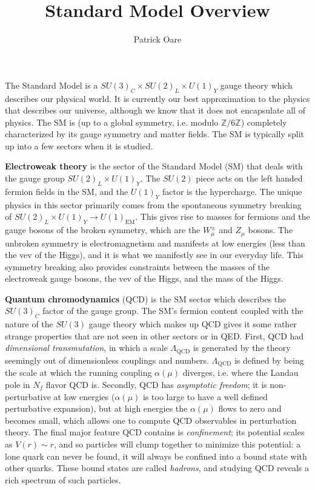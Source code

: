 \documentclass[11pt, oneside]{article}   	%
\title{Standard Model Overview}
\author{Patrick Oare}
\date{}							%
\theoremstyle{definition}
\begin{document}
\maketitle

The Standard Model is a $SU(3)_C\times SU(2)_L\times U(1)_Y$ gauge theory which describes our physical world. It is currently 
our best approximation to the physics that describes our universe, although we know that it does not encapsulate all of physics. 
The SM is (up to a global symmetry, i.e. modulo $\mathbb Z / 6\mathbb Z$) completely characterized by its gauge symmetry 
and matter fields. The SM is typically split up into a few sectors when it is studied.

\textbf{Electroweak theory} is the sector of the Standard Model (SM) that deals with the gauge group $SU(2)_L\times U(1)_Y$. The 
$SU(2)$ piece acts on the left handed fermion fields in the SM, and the $U(1)_Y$ factor is the hypercharge. The unique 
physics in this sector primarily comes from the spontaneous symmetry breaking of $SU(2)_L\times U(1)_Y
\rightarrow U(1)_\mathrm{EM}$. This gives rise to masses for fermions and the gauge bosons of the broken symmetry, 
which are the $W_\mu^\pm$ and $Z_\mu$ bosons. The unbroken symmetry is electromagnetism and manifests at low 
energies (less than the vev of the Higgs), and it is what we 
manifestly see in our everyday life. This symmetry breaking also provides constraints between the masses of the electroweak 
gauge bosons, the vev of the Higgs, and the mass of the Higgs. 

\textbf{Quantum chromodynamics} (QCD) is the SM sector which describes the $SU(3)_C$ factor of the gauge group. 
The SM's fermion content coupled with the nature of the $SU(3)$ gauge theory which makes up QCD gives it some 
rather strange properties that are not seen in other sectors or in QED. First, QCD had \textit{dimensional transmutation}, 
in which a scale $\Lambda_\mathrm{QCD}$ is generated by the theory seemingly out of dimensionless couplings and numbers. 
$\Lambda_\mathrm{QCD}$ is defined by being the scale at which the running coupling $\alpha(\mu)$ diverges, i.e. where the Landau 
pole in $N_f$ flavor QCD is. Secondly, QCD has \textit{asymptotic freedom}; it is non-perturbative at low energies ($\alpha(\mu)$ is 
too large to have a well defined perturbative expansion), but at high energies the $\alpha(\mu)$ flows to zero and becomes small, which 
allows one to compute QCD observables in perturbation theory. The final major feature QCD contains is \textit{confinement}; 
its potential scales as $V(r)\sim r$, and so particles will clump together to minimize this potential: a lone quark can never be found, 
it will always be confined into a bound state with other quarks. These bound states are called \textit{hadrons}, and studying QCD 
reveals a rich spectrum of such particles.
\end{document}
